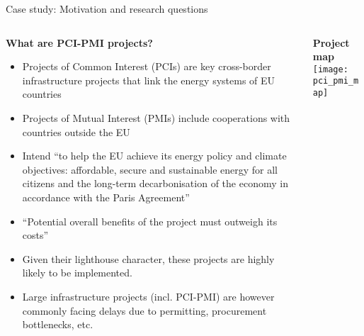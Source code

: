 \documentclass[10pt,aspectratio=169,dvipsnames]{beamer}
\begin{document}
\begin{frame}{Case study: Motivation and research questions}
  \scriptsize
  \begin{columns}[T] %
    \begin{column}{.63\textwidth}
        \begin{minipage}[t][.45\textheight]{\linewidth}
            \begin{alertblock}{\textbf{What are PCI-PMI projects?}}
                \begin{itemize}
                  \setlength\itemsep{0.85em}
                  \item Projects of Common Interest (PCIs) are key \alert{cross-border infrastructure projects} that link the energy systems of EU countries
                  \item Projects of Mutual Interest (PMIs) include cooperations with countries outside the EU
                  \item Intend ``to help the EU achieve its \alert{energy policy and climate objectives}: affordable, secure and sustainable energy for all citizens and the long-term decarbonisation of the economy in accordance with the \alert{Paris Agreement}''
                  \item ``Potential overall benefits of the project must outweigh its costs'' 
                  \item Given their \alert{lighthouse character}, these projects are highly likely to be implemented. 
                  \item Large infrastructure projects (incl. PCI-PMI) are however commonly facing delays due to permitting, procurement bottlenecks, etc.
                \end{itemize}
            \end{alertblock}
        \end{minipage}
    \end{column}
    
    \begin{column}{.36\textwidth}
        \begin{minipage}[t][.45\textheight]{\linewidth}
            \begin{alertblock}{\textbf{Project map}}
              \centering
              \texttt{[image: pci\_pmi\_map]}
            \end{alertblock}
        \end{minipage}
    \end{column}


\end{columns}
\end{frame}
\end{document}
